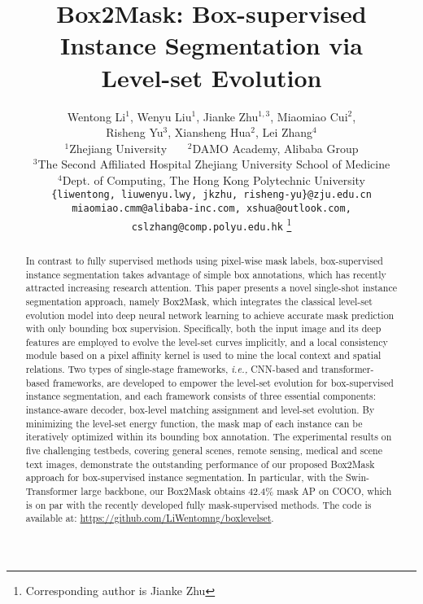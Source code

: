 \documentclass[12pt,onecolumn,letterpaper]{article}
\newcommand\blfootnote[1]{\begingroup
  \renewcommand\thefootnote{}\thanks{#1}\endgroup
}
\begin{document}
\title{Box2Mask: Box-supervised Instance Segmentation via \\ Level-set Evolution}

\author{{\normalsize Wentong Li$^1$, Wenyu Liu$^1$, Jianke Zhu$^{1,3}$, Miaomiao Cui$^2$,} \\ {\normalsize Risheng Yu$^3$,  Xiansheng Hua$^2$, Lei Zhang$^4$} \\ 
{\normalsize $^1$Zhejiang University \ \ \ $^2$DAMO Academy, Alibaba Group} \\
{\normalsize $^3$The Second Affiliated Hospital Zhejiang University School of Medicine} \\
{\normalsize $^4$Dept. of Computing, The Hong Kong Polytechnic University} \\
{\tt\small \{liwentong, liuwenyu.lwy, jkzhu, risheng-yu\}@zju.edu.cn} \\
{\tt\small miaomiao.cmm@alibaba-inc.com, xshua@outlook.com, cslzhang@comp.polyu.edu.hk}
\blfootnote{Corresponding author is Jianke Zhu}
}

\maketitle
\ificcvfinal\thispagestyle{empty}\fi

\begin{abstract}
      In contrast to fully supervised methods using pixel-wise mask labels, box-supervised instance segmentation takes advantage of simple box annotations, which has recently attracted increasing research attention. This paper presents a novel single-shot instance segmentation approach, namely Box2Mask, which integrates the classical level-set evolution model into deep neural network learning to achieve accurate mask prediction with only bounding box supervision.
      Specifically, both the input image and its deep features are employed to evolve the level-set curves implicitly, and a local consistency module based on a pixel affinity kernel is used to mine the local context and spatial relations.
      Two types of single-stage frameworks, \textit{i.e.,} CNN-based and transformer-based frameworks, are developed to empower the level-set evolution for box-supervised instance segmentation, and each framework consists of three essential components: instance-aware decoder, box-level matching assignment and level-set evolution. By minimizing the level-set energy function, the mask map of each instance can be iteratively optimized within its bounding box annotation. The experimental results on five challenging testbeds, covering general scenes, remote sensing, medical and scene text images, demonstrate the outstanding performance of our proposed Box2Mask approach for box-supervised instance segmentation. In particular, with the Swin-Transformer large backbone, our Box2Mask obtains 42.4\% mask AP on COCO, which is on par with the recently developed fully mask-supervised methods. The code is available at:  \href{https://github.com/LiWentomng/boxlevelset}{https://github.com/LiWentomng/boxlevelset}.
\end{abstract}
\end{document}
